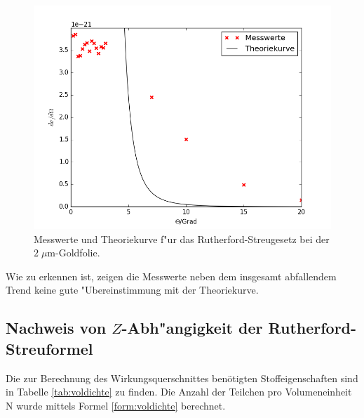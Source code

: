   \begin{figure}
    \centering
    \includegraphics[width=15cm]{skripte/ruther.png}
    \caption{Messwerte und Theoriekurve f"ur das Rutherford-Streugesetz bei der $2\; \mu \text{m}$-Goldfolie.}
    \label{plot:ruther}
  \end{figure}

  Wie zu erkennen ist, zeigen die Messwerte neben dem insgesamt abfallendem Trend keine gute "Ubereinstimmung mit der Theoriekurve.

  \newpage



  \subsection{Nachweis von $Z$-Abh"angigkeit der Rutherford-Streuformel}

Die zur Berechnung des Wirkungsquerschnittes benötigten Stoffeigenschaften sind in Tabelle \ref{tab:voldichte} zu finden. Die Anzahl der Teilchen pro Volumeneinheit N wurde mittels Formel \ref{form:voldichte} berechnet.

